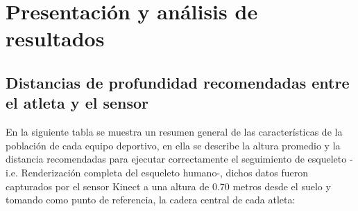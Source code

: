 \chapter{Presentaci\'on y an\'alisis de resultados}
\section{Distancias de profundidad recomendadas entre el atleta y el sensor} \label{res:idMov}
En la siguiente tabla se muestra un resumen general de las caracter\'isticas de la poblaci\'on de cada equipo deportivo, en ella se describe la altura promedio y la distancia recomendadas para ejecutar correctamente el seguimiento de esqueleto -i.e. Renderizaci\'on completa del esqueleto humano-, dichos datos fueron capturados por el sensor Kinect a una altura de 0.70 metros desde el suelo y tomando como punto de referencia, la cadera central de cada atleta:
